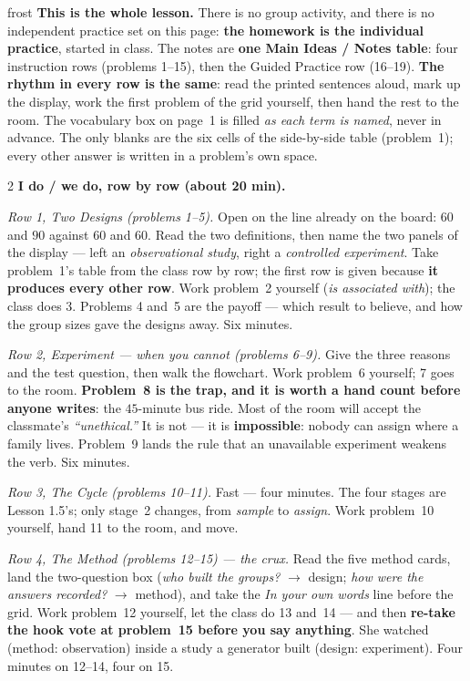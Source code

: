 \documentclass[10pt]{article}
\begin{document}
\boxguard
\begin{skillbox}{frost}
\textbf{This is the whole lesson.} There is no group activity, and there is no independent
practice set on this page: \textbf{the homework is the individual practice}, started in class.
The notes are \textbf{one Main Ideas / Notes table}: four instruction rows (problems 1--15),
then the Guided Practice row (16--19). \textbf{The rhythm in every row is the same}: read the
printed sentences aloud, mark up the display, work the first problem of the grid yourself, then
hand the rest to the room. The vocabulary box on page~1 is filled \emph{as each term is named},
never in advance. The only blanks are the six cells of the side-by-side table (problem~1);
every other answer is written in a problem's own space.
\begin{multicols}{2}
\textbf{I do / we do, row by row (about 20 min).}

\emph{Row 1, Two Designs (problems 1--5).} Open on the line already on the board: $60$ and $90$
against $60$ and $60$. Read the two definitions, then name the two panels of the display ---
left an \emph{observational study}, right a \emph{controlled experiment}. Take problem~1's table
from the class row by row; the first row is given because \textbf{it produces every other row}.
Work problem~2 yourself (\emph{is associated with}); the class does 3. Problems 4 and~5 are the
payoff --- which result to believe, and how the group sizes gave the designs away. Six minutes.

\emph{Row 2, Experiment --- when you cannot (problems 6--9).} Give the three reasons and the
test question, then walk the flowchart. Work problem~6 yourself; 7 goes to the room.
\textbf{Problem~8 is the trap, and it is worth a hand count before anyone writes}: the
$45$-minute bus ride. Most of the room will accept the classmate's \emph{``unethical.''} It is
not --- it is \textbf{impossible}: nobody can assign where a family lives. Problem~9 lands the
rule that an unavailable experiment weakens the verb. Six minutes.

\emph{Row 3, The Cycle (problems 10--11).} Fast --- four minutes. The four stages are Lesson
1.5's; only stage~2 changes, from \emph{sample} to \emph{assign}. Work problem~10 yourself,
hand 11 to the room, and move.

\emph{Row 4, The Method (problems 12--15) --- the crux.} Read the five method cards, land the
two-question box (\emph{who built the groups?} $\to$ design; \emph{how were the answers
recorded?} $\to$ method), and take the \emph{In your own words} line before the grid. Work
problem~12 yourself, let the class do 13 and~14 --- and then \textbf{re-take the hook vote at
problem~15 before you say anything}. She watched (method: observation) inside a study a
generator built (design: experiment). Four minutes on 12--14, four on 15.


\end{multicols}
\end{skillbox}
\end{document}
